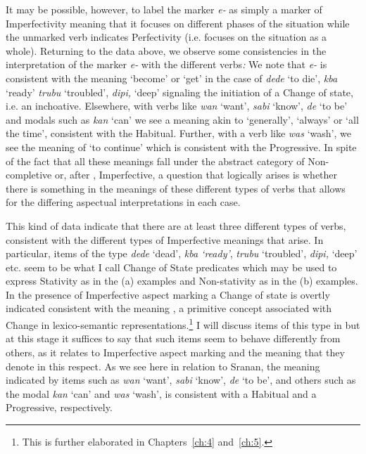 It may be possible, however,  to label the marker \textit{e-} as simply a
marker of Imperfectivity meaning that it focuses on different phases
of the situation \citep{Comrie1976} while the unmarked verb indicates
Perfectivity (i.e. focuses on the situation as a whole).  Returning
to the data above, we observe some consistencies in the interpretation
of the marker \textit{e-} with the different verbs\textit{:} We note
that \textit{e-} is consistent with the meaning ‘become’ or ‘get’
in the case of \textit{dede} `to die', \textit{kba} `ready'
\textit{trubu} `troubled', \textit{dipi,} `deep' signaling the
initiation of a Change of state, i.e. an inchoative.  Elsewhere, with
verbs like \textit{wan} ‘want’, \textit{sabi} `know', \textit{de} `to
be' and modals such as \textit{kan} `can' we see a meaning akin to
`generally', `always' or `all the time', consistent with the Habitual.
Further, with a verb like \textit{was} `wash', we see the meaning of
`to continue' which is consistent with the Progressive.  In spite of
the fact that all these meanings fall under the abstract category of
Non-completive or, after \citet{Comrie1976}, Imperfective, a question
that logically arises is whether there is something in the meanings of
these different types of verbs that allows for the differing aspectual
interpretations in each case.

This kind of data indicate that there are at least three different
types of verbs, consistent with the different types of Imperfective
meanings that arise.  In particular, items of the type \textit{dede
} `dead', \textit{kba `ready'}, \textit{trubu} `troubled',
\textit{dipi,} `deep' etc. seem to be what I call Change of State
predicates which may be used to express Stativity as in the (a)
examples and Non-stativity as in the (b) examples.  In the presence of
Imperfective aspect marking a Change of state is overtly indicated
consistent with the meaning \BECOME, a primitive concept associated
with Change in lexico-semantic representations.\footnote{This is
  further elaborated in Chapters~\ref{ch:4} and~\ref{ch:5}.}  I will discuss items
of this type in  but at this stage it suffices to say that
such items seem to behave differently from others, as it relates to
Imperfective aspect marking and the meaning that they denote in this
respect.  As we see here in relation to Sranan, the meaning indicated
by items such as \textit{wan} `want', \textit{sabi} `know',
\textit{de} `to be', and others such as the modal \textit{kan} `can'
and \textit{was} `wash', is consistent with a Habitual and a
Progressive, respectively.

